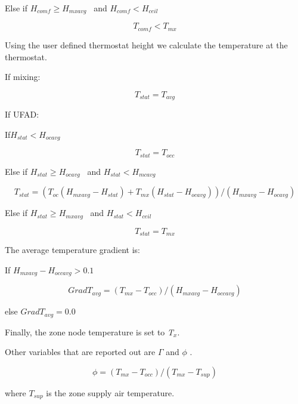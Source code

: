 Else if \({H_{comf}} \ge {H_{mxavg}}\) ~and \({H_{comf}} < {H_{ceil}}\)

\begin{equation}
{T_{comf}} < {T_{mx}}
\end{equation}

Using the user defined thermostat height we calculate the temperature at the thermostat.

If mixing:

\begin{equation}
{T_{stat}} = {T_{avg}}
\end{equation}

If UFAD:

If\({H_{stat}} < {H_{ocavg}}\)

\begin{equation}
{T_{stat}} = {T_{occ}}
\end{equation}

Else if \({H_{stat}} \ge {H_{ocavg}}\) ~and \({H_{stat}} < {H_{mcavg}}\)

\begin{equation}
{T_{stat}} = \left( {{T_{oc}}\left( {{H_{mxavg}} - {H_{stat}}} \right) + {T_{mx}}\left( {{H_{stat}} - {H_{ocavg}}} \right)} \right)/\left( {{H_{mxavg}} - {H_{ocavg}}} \right)
\end{equation}

Else if \({H_{stat}} \ge {H_{mxavg}}\) ~and \({H_{stat}} < {H_{ceil}}\)

\begin{equation}
{T_{stat}} = {T_{mx}}
\end{equation}

The average temperature gradient is:

If \({H_{mxavg}} - {H_{occavg}} > 0.1\)

\begin{equation}
Grad{T_{avg}} = ({T_{mx}} - {T_{occ}})/({H_{mxavg}} - {H_{occavg}})
\end{equation}

else \(Grad{T_{avg}} = 0.0\)

Finally, the zone node temperature is set to \emph{T\(_{x}\)}.

Other variables that are reported out are \(\Gamma\) and \(\phi\) .

\begin{equation}
\phi  = ({T_{mx}} - {T_{occ}})/({T_{mx}} - {T_{sup}})
\end{equation}

where \({T_{sup}}\) is the zone supply air temperature.

